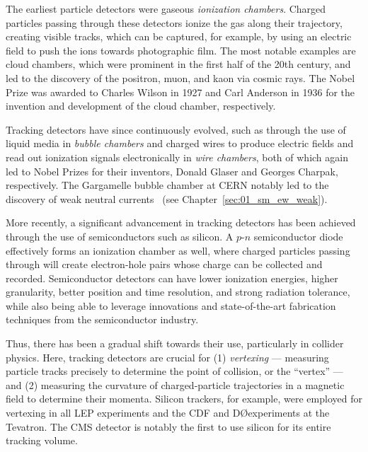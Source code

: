 The earliest particle detectors were gaseous \textit{ionization chambers}.
Charged particles passing through these detectors ionize the gas along their trajectory, creating visible tracks, which can be captured, for example, by using an electric field to push the ions towards photographic film.
The most notable examples are cloud chambers, which were prominent in the first half of the 20th century, and led to the discovery of the positron, muon, and kaon via cosmic rays.
The Nobel Prize was awarded to Charles Wilson in 1927 and Carl Anderson in 1936 for the invention and development of the cloud chamber, respectively.


Tracking detectors have since continuously evolved, such as through the use of liquid media in \textit{bubble chambers} and charged wires to produce electric fields and read out ionization signals electronically in \textit{wire chambers}, both of which again led to Nobel Prizes for their inventors, Donald Glaser and Georges Charpak, respectively.
The Gargamelle bubble chamber at CERN notably led to the discovery of weak neutral currents~\cite{GargamelleNeutrino:1973jyy} (see Chapter~\ref{sec:01_sm_ew_weak}).

More recently, a significant advancement in tracking detectors has been achieved through the use of semiconductors such as silicon.
A $p$-$n$ semiconductor diode~\cite{sparkes1994semiconductor, Nomerotski:2009zz} effectively forms an ionization chamber as well, where charged particles passing through will create electron-hole pairs whose charge can be collected and recorded.
Semiconductor detectors can have lower ionization energies, higher granularity, better position and time resolution, and strong radiation tolerance, while also being able to leverage innovations and state-of-the-art fabrication techniques from the semiconductor industry.

Thus, there has been a gradual shift towards their use, particularly in collider physics.
Here, tracking detectors are crucial for (1) \textit{vertexing} --- measuring particle tracks precisely to determine the point of collision, or the ``vertex'' --- and (2) measuring the curvature of charged-particle trajectories in a magnetic field to determine their momenta.
Silicon trackers, for example, were employed for vertexing in all LEP experiments and the CDF and D\O experiments at the Tevatron.
The CMS detector is notably the first to use silicon for its entire tracking volume.

